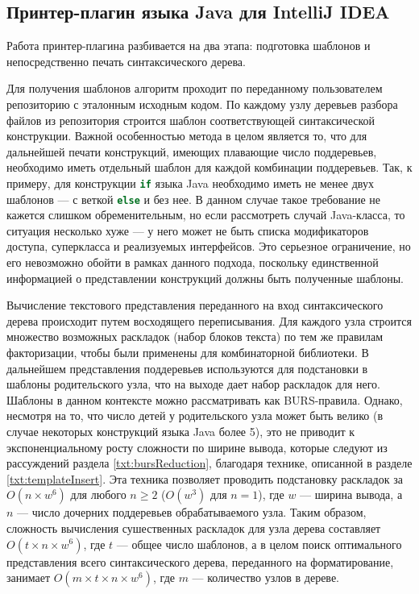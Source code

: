 \subsection{Принтер-плагин языка Java для IntelliJ IDEA}

Работа принтер-плагина разбивается на два этапа: подготовка шаблонов и непосредственно
печать синтаксического дерева.

Для получения шаблонов алгоритм проходит по переданному пользователем репозиторию с
эталонным исходным кодом. По каждому узлу деревьев разбора файлов из репозитория
строится шаблон соответствующей синтаксической конструкции. Важной особенностью
метода в целом
является то, что для дальнейшей печати конструкций, имеющих плавающие число
поддеревьев, необходимо иметь отдельный шаблон для каждой комбинации поддеревьев.
Так, к примеру, для конструкции \lstinline[language = Java]{if} языка Java
необходимо иметь не менее двух шаблонов --- с веткой \lstinline[language = Java]{else}
и без нее. В данном случае такое требование не кажется слишком обременительным, но
если рассмотреть случай Java-класса, то ситуация несколько хуже --- у него может не
быть списка модификаторов доступа, суперкласса и реализуемых интерфейсов.
Это серьезное ограничение, но его невозможно обойти в рамках данного подхода,
поскольку единственной информацией о представлении конструкций должны быть
полученные шаблоны.

Вычисление текстового представления переданного на вход синтаксического
дерева происходит путем восходящего переписывания. Для каждого узла строится множество
возможных раскладок (набор блоков текста) по тем же правилам факторизации, чтобы были
применены для комбинаторной библиотеки. В дальнейшем представления поддеревьев
используются для подстановки в шаблоны родительского узла, что на выходе дает
набор раскладок для него. Шаблоны в данном контексте можно рассматривать как
BURS-правила.
Однако, несмотря на то, что число детей у родительского узла может
быть велико (в случае некоторых конструкций языка Java более 5),
это не приводит к экспоненциальному росту сложности по ширине вывода, которые
следуют из рассуждений раздела \ref{txt:bursReduction}, благодаря технике, описанной
в разделе \ref{txt:templateInsert}. Эта техника позволяет проводить подстановку
раскладок за 
$O(n \times w^{6})$ для любого $n \geq 2$ ($O(w^{3})$ для $n = 1$), где
$w$ --- ширина вывода, а $n$ --- число дочерних поддеревьев обрабатываемого узла.
Таким образом, сложность вычисления сушественных раскладок для узла дерева
составляет $O(t \times n \times w^{6})$, где $t$ --- общее число шаблонов,
а в целом поиск оптимального представления всего синтаксического дерева, переданного
на форматирование, занимает $O(m \times t \times n \times w^{6})$, где $m$
--- количество узлов в дереве.


